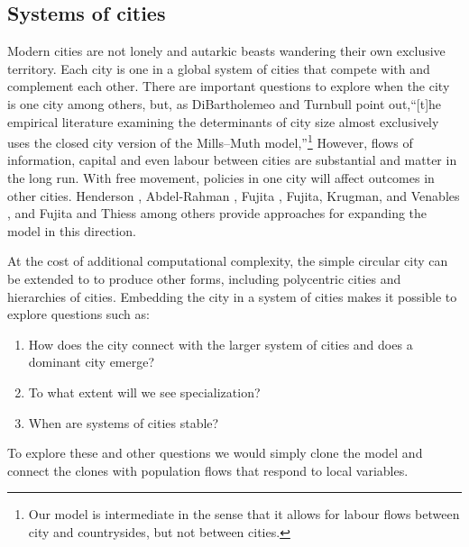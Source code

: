 \subsection{Systems of cities}
%
Modern cities are not lonely and autarkic beasts wandering their own exclusive territory. Each city is one in a global system of cities that compete with and complement each other. 
There are important questions to explore when the city is one city among others, but, as DiBartholemeo and Turnbull \cite{dibartolomeoClosedVsOpen2023} point out,``[t]he empirical literature examining the determinants of city size almost exclusively uses the closed city version of the Mills–Muth model,''\footnote{Our model is intermediate in the sense that it allows for labour flows  between city and countrysides, but not between cities.} 
However, flows of information, capital and even labour between cities are substantial and matter in the long run. With free movement, policies in one city will affect outcomes in other cities. Henderson \cite{Henderson1972Sizes}, Abdel-Rahman \cite{abdel-rahmanAgglomerationEconomiesTypes1990}, Fujita \cite{fujitaMonopolisticCompetitionModel1988}, Fujita, Krugman, and Venables \cite{fujitaSpatialEconomyCities1999}, and Fujita and Thiess \cite{fujitaEconomicsAgglomeration1996} among others provide approaches for expanding the model in this direction.  %

At the cost of additional computational complexity, the simple circular city can be extended to to produce other forms, including polycentric cities and hierarchies of cities. Embedding the city in a system of cities makes it possible to explore questions such as: %
\begin{enumerate}
\item How does the city connect with the larger system of cities and does a dominant city emerge? 
\item To what extent will we see specialization? 
\item When are systems of cities stable? 
\end{enumerate}
To explore these and other questions we would simply clone the model and connect the clones with population flows that respond to local variables.


